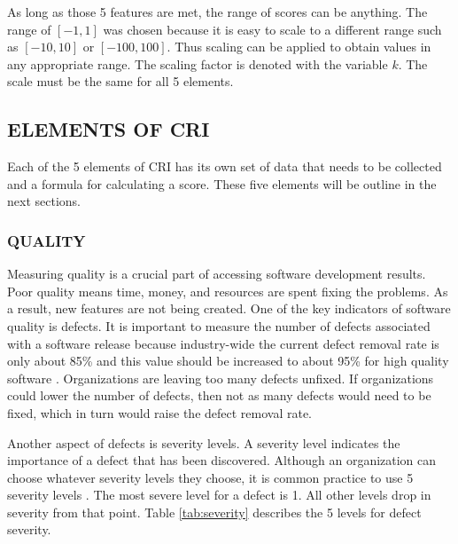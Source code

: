\documentclass[SDSUThesis.tex]{subfiles}
\begin{document}
    As long as those 5 features are met, the range of scores can be anything.  
    The range of $[-1,1]$ was chosen because it is easy to scale 
    to a different range such as $[-10,10]$ or $[-100,100]$.  
    Thus scaling can be applied to obtain values in any appropriate range. 
    The scaling factor is denoted with the variable $k$.  
    The scale must be the same
    for all 5 elements.
    
    \subsection{ELEMENTS OF CRI}
        Each of the 5 elements of CRI has its own set of data that needs to
        be collected and a formula for calculating a score. 
        These five elements will be outline in the next sections.
        
        \subsubsection{QUALITY}
            Measuring quality is a crucial part of accessing 
            software development results.  
            Poor quality means time, money, and resources are spent 
            fixing the problems. As a result, new features are not being
            created. One of the key indicators of software quality 
            is defects.  It is important
            to measure the number of defects associated with a software 
            release because industry-wide the current defect removal rate is only 
            about 85\% and this value should be increased to 
            about 95\% for high quality software \cite{Jones2009}. 
            Organizations are leaving too many defects unfixed.  If organizations
            could lower the number of defects, then not as many defects would
            need to be fixed, which in turn would raise the defect removal rate.
            
            Another aspect of defects is severity levels.  A severity level indicates
            the importance of a defect that has been discovered.  Although an
            organization can choose whatever severity levels they choose, it is
            common practice to use 5 severity levels \cite{Raynus1999}.  The most 
            severe level for a defect is 1.  All other levels drop in severity 
            from that point. Table \ref{tab:severity} describes the 5 levels
            for defect severity.  
\end{document}
